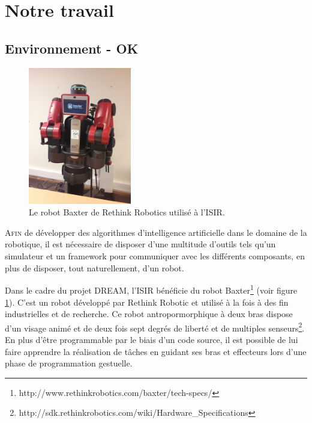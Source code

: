 \documentclass[draft]{llncs}
\begin{document}
\section{Notre travail}


\subsection{Environnement - OK}

\begin{figure}
  \begin{center}
    \includegraphics[angle=-90, width=0.4\textwidth]{figures/baxter}
  \end{center}
  \caption{Le robot Baxter de Rethink Robotics utilisé à l'ISIR.}
  \label{fig:baxter}
\end{figure}

\lettrine{A}{fin} de développer des algorithmes d'intelligence artificielle dans le domaine de la robotique, il est nécessaire de disposer d'une multitude d'outils tels qu'un simulateur et un framework pour communiquer avec les différents composants, en plus de disposer, tout naturellement, d'un robot.


Dans le cadre du projet DREAM, l'ISIR bénéficie du robot Baxter\footnote{http://www.rethinkrobotics.com/baxter/tech-specs/} (voir figure \ref{fig:baxter}).
C'est un robot développé par Rethink Robotic et utilisé à la fois à des fin industrielles et de recherche.
Ce robot antropormorphique à deux bras dispose d'un \og{}visage animé\fg{} et de deux fois sept degrés de liberté et de multiples senseurs\footnote{http://sdk.rethinkrobotics.com/wiki/Hardware\_Specifications}.
En plus d'être programmable par le biais d'un code source, il est possible de lui faire apprendre la réalisation de tâches en guidant ses bras et effecteurs lors d'une phase de programmation gestuelle.
\end{document}
